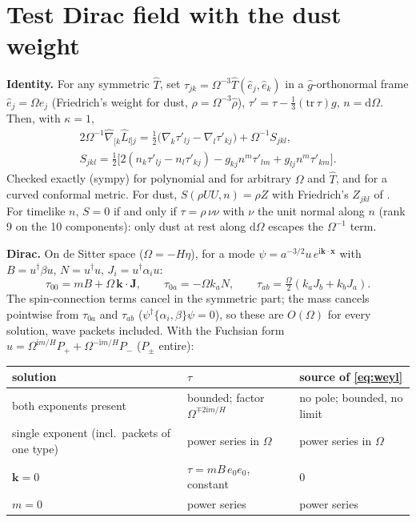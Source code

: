 \documentclass[11pt,a4paper]{article}
\newcommand{\dd}{\mathrm{d}}
\newcommand{\ii}{\mathrm{i}}
\begin{document}
\section{Test Dirac field with the dust weight}
\label{sec:rj}
\textbf{Identity.} For any symmetric $\hat T$, set $\tau_{jk}=\Omega^{-3}\hat T(\hat e_{j},\hat e_{k})$ in a $\hat g$-orthonormal frame $\hat e_{j}=\Omega e_{j}$ (Friedrich's weight for dust, $\rho=\Omega^{-3}\hat\rho$), $\tau'=\tau-\tfrac13(\mathrm{tr}\,\tau)g$, $n=\dd\Omega$. Then, with $\kappa=1$,
\begin{gather}
2\Omega^{-1}\hat\nabla_{[k}\hat L_{l]j}=\tfrac12\big(\nabla_{k}\tau'_{lj}-\nabla_{l}\tau'_{kj}\big)+\Omega^{-1}S_{jkl},\\
S_{jkl}=\tfrac12\big[2(n_{k}\tau'_{lj}-n_{l}\tau'_{kj})-g_{kj}n^{m}\tau'_{lm}+g_{lj}n^{m}\tau'_{km}\big].
\end{gather}
Checked exactly (sympy) for polynomial and for arbitrary $\Omega$ and $\hat T$, and for a curved conformal metric. For dust, $S(\rho UU,n)=\rho Z$ with Friedrich's $Z_{jkl}$ of \cite[(3.20)]{Friedrich2017}. For timelike $n$, $S=0$ if and only if $\tau=\rho\,\nu\nu$ with $\nu$ the unit normal along $n$ (rank 9 on the 10 components): only dust at rest along $\dd\Omega$ escapes the $\Omega^{-1}$ term.

\textbf{Dirac.} On de Sitter space ($\Omega=-H\eta$), for a mode $\psi=a^{-3/2}u\,e^{\ii\mathbf{k}\cdot\mathbf{x}}$ with $B=u^{\dagger}\beta u$, $N=u^{\dagger}u$, $J_{i}=u^{\dagger}\alpha_{i}u$:
\begin{equation}
\tau_{00}=mB+\Omega\,\mathbf{k}\cdot\mathbf{J},\qquad \tau_{0a}=-\Omega k_{a}N,\qquad \tau_{ab}=\tfrac{\Omega}{2}(k_{a}J_{b}+k_{b}J_{a}).
\end{equation}
The spin-connection terms cancel in the symmetric part; the mass cancels pointwise from $\tau_{0a}$ and $\tau_{ab}$ ($\psi^{\dagger}\{\alpha_{i},\beta\}\psi=0$), so these are $O(\Omega)$ for every solution, wave packets included. With the Fuchsian form $u=\Omega^{\ii m/H}P_{+}+\Omega^{-\ii m/H}P_{-}$ ($P_{\pm}$ entire):

\begin{center}\small
\begin{tabular}{lll}
\toprule
solution & $\tau$ & source of \eqref{eq:weyl}\\
\midrule
both exponents present & bounded; factor $\Omega^{\mp2\ii m/H}$ & no pole; bounded, no limit\\
single exponent (incl.\ packets of one type) & power series in $\Omega$ & power series in $\Omega$\\
$\mathbf{k}=0$ & $\tau=mB\,e_{0}e_{0}$, constant & $0$\\
$m=0$ & power series & power series\\
\bottomrule
\end{tabular}
\end{center}
\end{document}
